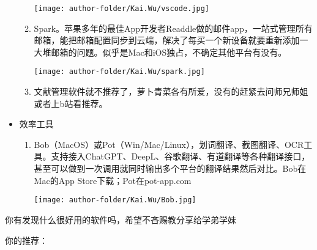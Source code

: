 \begin{itemize}
\begin{enumerate}
        \texttt{[image: author-folder/Kai.Wu/vscode.jpg]}
        \item Spark。苹果多年的最佳App开发者Readdle做的邮件app，一站式管理所有邮箱，能把邮箱配置同步到云端，解决了每买一个新设备就要重新添加一大堆邮箱的问题。似乎是Mac和iOS独占，不确定其他平台有没有。

        \texttt{[image: author-folder/Kai.Wu/spark.jpg]}
        \item 文献管理软件就不推荐了，萝卜青菜各有所爱，没有的赶紧去问师兄师姐或者上b站看推荐。
    \end{enumerate}
    \item 效率工具
    \begin{enumerate}
        \item Bob（MacOS）或Pot（Win/Mac/Linux），划词翻译、截图翻译、OCR工具。支持接入ChatGPT、DeepL、谷歌翻译、有道翻译等各种翻译接口，甚至可以做到一次调用就同时输出多个平台的翻译结果然后对比。Bob在Mac的App Store下载；Pot在pot-app.com

        \texttt{[image: author-folder/Kai.Wu/Bob.jpg]}
    \end{enumerate}
\end{itemize}

你有发现什么很好用的软件吗，希望不吝赐教分享给学弟学妹

你的推荐：